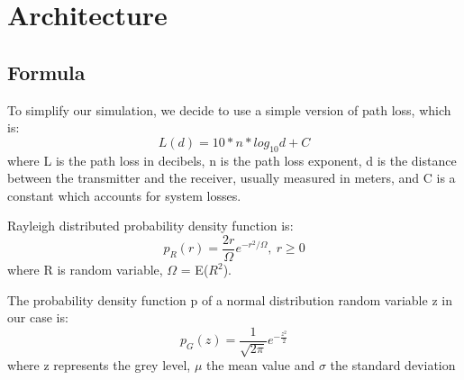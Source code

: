 \section{Architecture}
\subsection{Formula}
To simplify our simulation, we decide to use a simple version of path loss, which is:
\begin{equation}
L(d)=10*n*log_{10}d + C
\end{equation}
where L is the path loss in decibels, n is the path loss exponent, d is the distance between the transmitter and the receiver, usually measured in meters, and C is a constant which accounts for system losses.
\vspace{1cm}
\par
Rayleigh distributed probability density function is:
\begin{equation}
p_{R}(r)={\frac {2r}{\Omega }}e^{-r^{2}/\Omega },\ r\geq {}0
\end{equation}
where R is random variable, $\Omega$ = E($R^{2}$).
\vspace{1cm}
\par
The probability density function p of a normal distribution random variable z in our case is:
\begin{equation}
p_{G}(z)={\frac {1}{ {\sqrt {2\pi }}}}e^{-{\frac {z^{2}}{2}}}
\end{equation}
where z represents the grey level, $\mu$  the mean value and $\sigma$  the standard deviation

